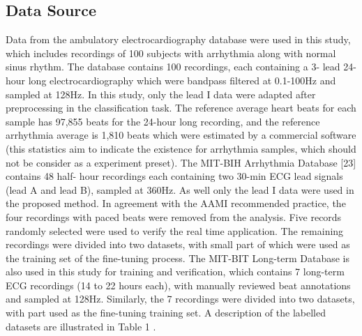 \documentclass[journal]{IEEEtran}
\begin{document}
\subsection{Data Source}
Data from the ambulatory electrocardiography database were used in this study, which includes recordings of 100 subjects with arrhythmia along with normal sinus rhythm. The database contains 100 recordings, each containing a 3- lead 24-hour long electrocardiography which were bandpass filtered at 0.1-100Hz and sampled at 128Hz. In this study, only the lead I data were adapted after preprocessing in the classification task. The reference average heart beats for each sample has 97,855 beats for the 24-hour long recording, and the reference arrhythmia average is 1,810 beats which were estimated by a commercial software (this statistics aim to indicate the existence for arrhythmia samples, which should not be consider as a experiment preset).
The MIT-BIH Arrhythmia Database [23] contains 48 half- hour recordings each containing two 30-min ECG lead signals (lead A and lead B), sampled at 360Hz. As well only the lead I data were used in the proposed method. In agreement with the AAMI recommended practice, the four recordings with paced beats were removed from the analysis. Five records randomly selected were used to verify the real time application. The remaining recordings were divided into two datasets, with small part of which were used as the training set of the fine-tuning process.
The MIT-BIT Long-term Database is also used in this study for training and verification, which contains 7 long-term ECG recordings (14 to 22 hours each), with manually reviewed beat annotations and sampled at 128Hz. Similarly, the 7 recordings were divided into two datasets, with part used as the fine-tuning training set. A description of the labelled datasets are illustrated in Table 1 .
\end{document}
